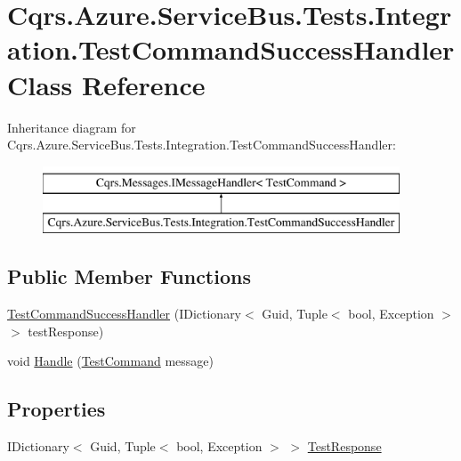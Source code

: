 \hypertarget{classCqrs_1_1Azure_1_1ServiceBus_1_1Tests_1_1Integration_1_1TestCommandSuccessHandler}{}\section{Cqrs.\+Azure.\+Service\+Bus.\+Tests.\+Integration.\+Test\+Command\+Success\+Handler Class Reference}
\label{classCqrs_1_1Azure_1_1ServiceBus_1_1Tests_1_1Integration_1_1TestCommandSuccessHandler}
Inheritance diagram for Cqrs.\+Azure.\+Service\+Bus.\+Tests.\+Integration.\+Test\+Command\+Success\+Handler\+:\begin{figure}[H]
\begin{center}
\leavevmode
\includegraphics[height=2.000000cm]{classCqrs_1_1Azure_1_1ServiceBus_1_1Tests_1_1Integration_1_1TestCommandSuccessHandler}
\end{center}
\end{figure}
\subsection*{Public Member Functions}
\begin{DoxyCompactItemize}
\item 
\hyperlink{classCqrs_1_1Azure_1_1ServiceBus_1_1Tests_1_1Integration_1_1TestCommandSuccessHandler_a1ffd3c5c1e179f38bbccbbdec48e9701}{Test\+Command\+Success\+Handler} (I\+Dictionary$<$ Guid, Tuple$<$ bool, Exception $>$$>$ test\+Response)
\item 
void \hyperlink{classCqrs_1_1Azure_1_1ServiceBus_1_1Tests_1_1Integration_1_1TestCommandSuccessHandler_a235fa7b6ffe7108a47e33d5eb1c4fa49}{Handle} (\hyperlink{classCqrs_1_1Azure_1_1ServiceBus_1_1Tests_1_1Unit_1_1TestCommand}{Test\+Command} message)
\end{DoxyCompactItemize}
\subsection*{Properties}
\begin{DoxyCompactItemize}
\item 
I\+Dictionary$<$ Guid, Tuple$<$ bool, Exception $>$ $>$ \hyperlink{classCqrs_1_1Azure_1_1ServiceBus_1_1Tests_1_1Integration_1_1TestCommandSuccessHandler_a2e843e55bab5553cd1ecfaa330d76ef2}{Test\+Response}
\end{DoxyCompactItemize}


